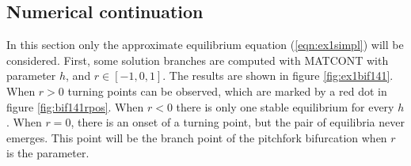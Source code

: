 \subsection{Numerical continuation}
In this section only the approximate equilibrium equation (\ref{eqn:ex1simpl}) will be considered. First, some solution branches are computed with MATCONT with parameter $h$, and $r\in[-1,0,1]$. The results are shown in figure \ref{fig:ex1bif141}. When $r>0$ turning points can be observed, which are marked by a red dot in figure \ref{fig:bif141rpos}. When $r<0$ there is only one stable equilibrium for every $h$. When $r=0$, there is an onset of a turning point, but the pair of equilibria never emerges. This point will be the branch point of the pitchfork bifurcation when $r$ is the parameter.
\begin{figure}[htp]
\centering
{}

\end{figure}
